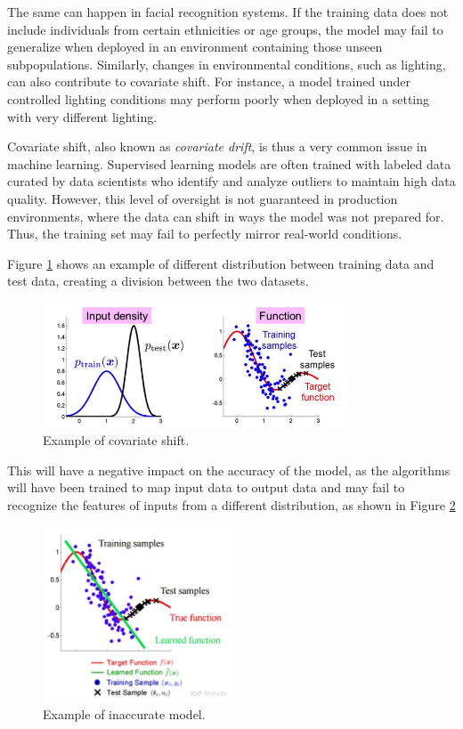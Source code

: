 The same can happen in facial recognition systems. If the training data does not include individuals from certain ethnicities or age groups, the model may fail to generalize when deployed in an environment containing those unseen subpopulations. Similarly, changes in environmental conditions, such as lighting, can also contribute to covariate shift. For instance, a model trained under controlled lighting conditions may perform poorly when deployed in a setting with very different lighting.
	
Covariate shift, also known as \textit{covariate drift}, is thus a very common issue in machine learning. Supervised learning models are often trained with labeled data curated by data scientists who identify and analyze outliers to maintain high data quality. However, this level of oversight is not guaranteed in production environments, where the data can shift in ways the model was not prepared for. Thus, the training set may fail to perfectly mirror real-world conditions.

Figure \ref{fig:covariate-shift} shows an example of different distribution between training data and test data, creating a division between the two datasets.  

	\begin{figure}[H]
		\centering
		\includegraphics[width=0.8\textwidth]{assets/immagine.png} 
		\caption{Example of covariate shift.}
		\label{fig:covariate-shift}
	\end{figure}
	
This will have a negative impact on the accuracy of the model, as the algorithms will have been trained to map input data to output data and may fail to recognize the features of inputs from a different distribution, as shown in Figure \ref{fig:inaccurate-model}  
	
	\begin{figure}[H]
		\centering
		\includegraphics[width=0.5\textwidth]{assets/covariate_shift.png} 
		\caption{Example of inaccurate model.}
		\label{fig:inaccurate-model}
	\end{figure}  

